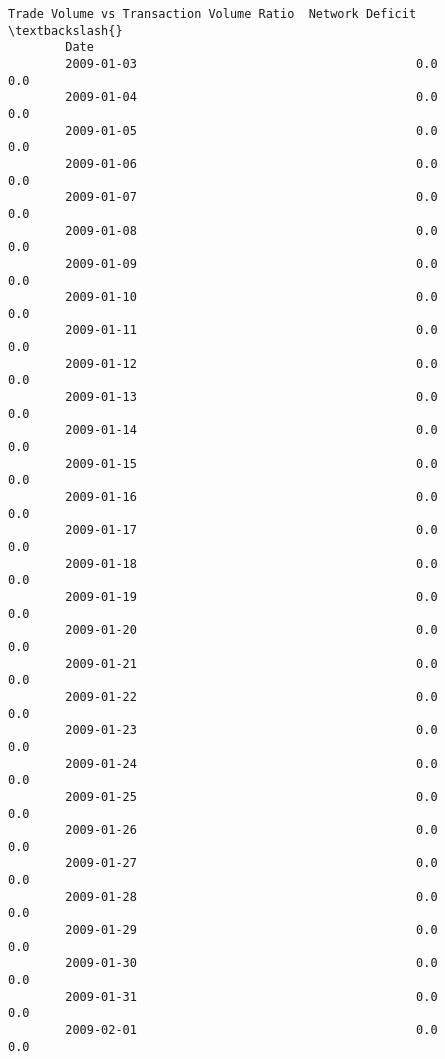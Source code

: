 \documentclass[11pt]{article}
\begin{document}
\begin{Verbatim}[commandchars=\\\{\}]
                    Trade Volume vs Transaction Volume Ratio  Network Deficit  \textbackslash{}
        Date                                                                    
        2009-01-03                                       0.0              0.0   
        2009-01-04                                       0.0              0.0   
        2009-01-05                                       0.0              0.0   
        2009-01-06                                       0.0              0.0   
        2009-01-07                                       0.0              0.0   
        2009-01-08                                       0.0              0.0   
        2009-01-09                                       0.0              0.0   
        2009-01-10                                       0.0              0.0   
        2009-01-11                                       0.0              0.0   
        2009-01-12                                       0.0              0.0   
        2009-01-13                                       0.0              0.0   
        2009-01-14                                       0.0              0.0   
        2009-01-15                                       0.0              0.0   
        2009-01-16                                       0.0              0.0   
        2009-01-17                                       0.0              0.0   
        2009-01-18                                       0.0              0.0   
        2009-01-19                                       0.0              0.0   
        2009-01-20                                       0.0              0.0   
        2009-01-21                                       0.0              0.0   
        2009-01-22                                       0.0              0.0   
        2009-01-23                                       0.0              0.0   
        2009-01-24                                       0.0              0.0   
        2009-01-25                                       0.0              0.0   
        2009-01-26                                       0.0              0.0   
        2009-01-27                                       0.0              0.0   
        2009-01-28                                       0.0              0.0   
        2009-01-29                                       0.0              0.0   
        2009-01-30                                       0.0              0.0   
        2009-01-31                                       0.0              0.0   
        2009-02-01                                       0.0              0.0   

\end{Verbatim}
\end{document}
